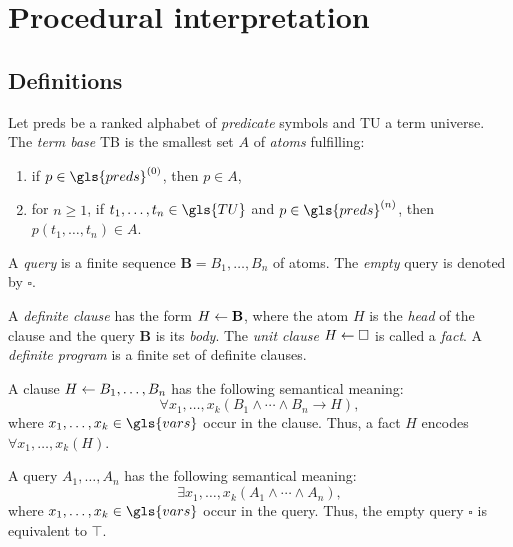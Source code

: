 \chapter{Procedural interpretation}

\section{Definitions}

\begin{dfn}
    Let \gls{preds} be a ranked alphabet of \emph{predicate} symbols and \gls{TU} a term universe.
    The \emph{term base} \gls{TB} is the smallest set \(A\) of \emph{atoms} fulfilling:
    \begin{enumerate}
        \item if \(p \in \gls{preds}^{(0)}\), then \(p \in A\),
        \item for \(n \ge 1\), if \(t_1,\dotsc,t_n \in \gls{TU}\) and \(p \in \gls{preds}^{(n)}\), then \(p(t_1,\dotsc,t_n) \in A\).
    \end{enumerate}
\end{dfn}

\begin{dfn}
    A \emph{query} is a finite sequence \(\mathbf{B} = B_1,\dotsc,B_n\) of atoms. The \emph{empty} query is denoted by \(\square\).

    A \emph{definite clause} has the form \(H \leftarrow \mathbf{B}\), where the atom \(H\) is the \emph{head} of the clause and the query \(\mathbf{B}\) is its \emph{body}.
    The \emph{unit clause} \(H \leftarrow \square\) is called a \emph{fact}.
    A \emph{definite program} is a finite set of definite clauses.
\end{dfn}

\begin{rem}
    A clause \(H \leftarrow B_1,\dotsc,B_n\) has the following semantical meaning:
    \begin{equation*}
        \forall{x_1,\dotsc,x_k}(B_1 \land \dotsb \land B_n \to H),
    \end{equation*}
    where \(x_1,\dotsc,x_k \in \gls{vars}\) occur in the clause.
    Thus, a fact \(H\) encodes \(\forall{x_1,\dotsc,x_k}(H)\).

    A query \(A_1,\dotsc,A_n\) has the following semantical meaning:
    \begin{equation*}
        \exists{x_1,\dotsc,x_k}(A_1 \land \dotsb \land A_n),
    \end{equation*}
    where \(x_1,\dotsc,x_k \in \gls{vars}\) occur in the query.
    Thus, the empty query \(\square\) is equivalent to \(\top\).
\end{rem}

